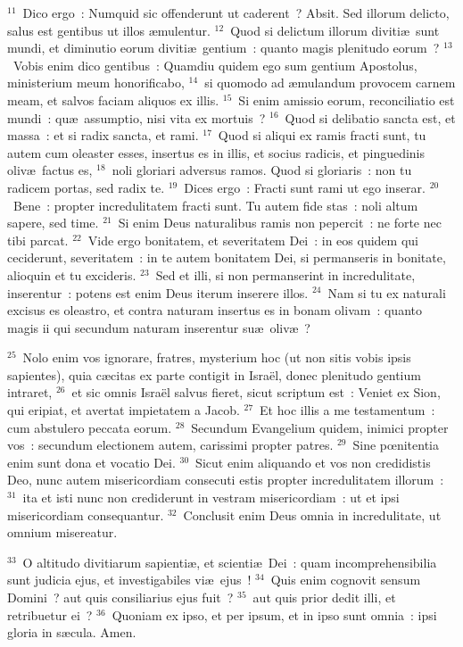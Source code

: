 ${}^{11}$~Dico ergo~: Numquid sic offenderunt ut caderent~? Absit. Sed illorum delicto, salus est gentibus ut illos \ae mulentur.
${}^{12}$~Quod si delictum illorum diviti\ae\ sunt mundi, et diminutio eorum diviti\ae\ gentium~: quanto magis plenitudo eorum~?
${}^{13}$~Vobis enim dico gentibus~: Quamdiu quidem ego sum gentium Apostolus, ministerium meum honorificabo,
${}^{14}$~si quomodo ad \ae mulandum provocem carnem meam, et salvos faciam aliquos ex illis.
${}^{15}$~Si enim amissio eorum, reconciliatio est mundi~: qu\ae\ assumptio, nisi vita ex mortuis~?
${}^{16}$~Quod si delibatio sancta est, et massa~: et si radix sancta, et rami.
${}^{17}$~Quod si aliqui ex ramis fracti sunt, tu autem cum oleaster esses, insertus es in illis, et socius radicis, et pinguedinis oliv\ae\ factus es,
${}^{18}$~noli gloriari adversus ramos. Quod si gloriaris~: non tu radicem portas, sed radix te.
${}^{19}$~Dices ergo~: Fracti sunt rami ut ego inserar.
${}^{20}$~Bene~: propter incredulitatem fracti sunt. Tu autem fide stas~: noli altum sapere, sed time.
${}^{21}$~Si enim Deus naturalibus ramis non pepercit~: ne forte nec tibi parcat.
${}^{22}$~Vide ergo bonitatem, et severitatem Dei~: in eos quidem qui ceciderunt, severitatem~: in te autem bonitatem Dei, si permanseris in bonitate, alioquin et tu excideris.
${}^{23}$~Sed et illi, si non permanserint in incredulitate, inserentur~: potens est enim Deus iterum inserere illos.
${}^{24}$~Nam si tu ex naturali excisus es oleastro, et contra naturam insertus es in bonam olivam~: quanto magis ii qui secundum naturam inserentur su\ae\ oliv\ae~?


${}^{25}$~Nolo enim vos ignorare, fratres, mysterium hoc (ut non sitis vobis ipsis sapientes), quia c\ae citas ex parte contigit in Isra\"el, donec plenitudo gentium intraret,
${}^{26}$~et sic omnis Isra\"el salvus fieret, sicut scriptum est~: Veniet ex Sion, qui eripiat, et avertat impietatem a Jacob.
${}^{27}$~Et hoc illis a me testamentum~: cum abstulero peccata eorum.
${}^{28}$~Secundum Evangelium quidem, inimici propter vos~: secundum electionem autem, carissimi propter patres.
${}^{29}$~Sine pœnitentia enim sunt dona et vocatio Dei.
${}^{30}$~Sicut enim aliquando et vos non credidistis Deo, nunc autem misericordiam consecuti estis propter incredulitatem illorum~:
${}^{31}$~ita et isti nunc non crediderunt in vestram misericordiam~: ut et ipsi misericordiam consequantur.
${}^{32}$~Conclusit enim Deus omnia in incredulitate, ut omnium misereatur.


${}^{33}$~O altitudo divitiarum sapienti\ae , et scienti\ae\ Dei~: quam incomprehensibilia sunt judicia ejus, et investigabiles vi\ae\ ejus~!
${}^{34}$~Quis enim cognovit sensum Domini~? aut quis consiliarius ejus fuit~?
${}^{35}$~aut quis prior dedit illi, et retribuetur ei~?
${}^{36}$~Quoniam ex ipso, et per ipsum, et in ipso sunt omnia~: ipsi gloria in s\ae cula. Amen.

